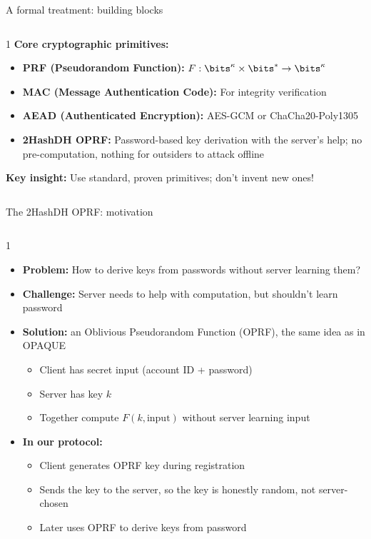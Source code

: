 \ifdefined\PRESENTATION\else\PassOptionsToClass{handout}{beamer}\fi\documentclass[aspectratio=169, lualatex]{beamer}
\begin{document}
\begin{frame}{A formal treatment: building blocks}
	\begin{columns}[c]
		\begin{column}{1\textwidth}
			\textbf{Core cryptographic primitives:}
			\begin{itemize}
				\item \textbf{PRF (Pseudorandom Function):} $F: \bits^{\kappa} \times \bits^{*} \to \bits^{\kappa}$
				\item \textbf{MAC (Message Authentication Code):} For integrity verification
				\item \textbf{AEAD (Authenticated Encryption):} AES-GCM or ChaCha20-Poly1305
				\item \textbf{2HashDH OPRF:} Password-based key derivation with the server's help; no pre-computation, nothing for outsiders to attack offline
			\end{itemize}
			\vspace{0.3cm}
			\textbf{Key insight:} Use standard, proven primitives; don't invent new ones!
		\end{column}
	\end{columns}
\end{frame}

\begin{frame}{The 2HashDH OPRF: motivation}
	\begin{columns}[c]
		\begin{column}{1\textwidth}
			\begin{itemize}
				\item \textbf{Problem:} How to derive keys from passwords without server learning them?
				\item \textbf{Challenge:} Server needs to help with computation, but shouldn't learn password
				\item \textbf{Solution:} an Oblivious Pseudorandom Function (OPRF), the same idea as in OPAQUE
				      \begin{itemize}
					      \item Client has secret input (account ID + password)
					      \item Server has key $k$
					      \item Together compute $F(k, \text{input})$ without server learning input
				      \end{itemize}
				\item \textbf{In our protocol:}
				      \begin{itemize}
					      \item Client generates OPRF key during registration
					      \item Sends the key to the server, so the key is honestly random, not server-chosen
					      \item Later uses OPRF to derive keys from password
				      \end{itemize}
			\end{itemize}
		\end{column}
	\end{columns}
\end{frame}
\end{document}
